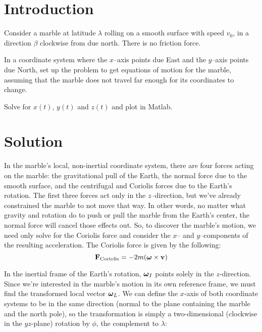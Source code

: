 \documentclass{article}
\begin{document}
\insertTitle

\section{Introduction}

Consider a marble at latitude $\lambda$ rolling on a smooth surface with speed $v_0$, in a direction $\beta$ clockwise from due north. There is no friction force.

In a coordinate system where the $x$--axis points due East and the $y$--axis points due North, set up the problem to get equations of motion for the marble, assuming that the marble does not travel far enough for its coordinates to change.

Solve for $x(t)$, $y(t)$ and $z(t)$ and plot in Matlab.

\section{Solution}

In the marble's local, non-inertial coordinate system, there are four forces acting on the marble: the gravitational pull of the Earth, the normal force due to the smooth surface, and the centrifugal and Coriolis forces due to the Earth's rotation. The first three forces act only in the $z$--direction, but we've already constrained the marble to not move that way. In other words, no matter what gravity and rotation do  to push or pull the marble from the Earth's center, the normal force will cancel those effects out. So, to discover the marble's motion, we need only solve for the Coriolis force and consider the $x$-- and $y$--components of the resulting acceleration. The Coriolis force is given by the following:
\begin{equation}
\vb{F}_{\text{Coriolis}} = -2m(\vb*{\omega}\times \vb{v})
\end{equation}

In the inertial frame of the Earth's rotation, $\vb*{\omega}_I$ points solely in the $z$-direction. Since we're interested in the marble's motion in its own reference frame, we must find the transformed local vector $\vb*{\omega}_L$. We can define the $x$-axis of both coordinate systems to be in the same direction (normal to the plane containing the marble and the north pole), so the transformation is simply a two-dimensional (clockwise in the $yz$-plane) rotation by $\phi$, the complement to $\lambda$:
\end{document}
